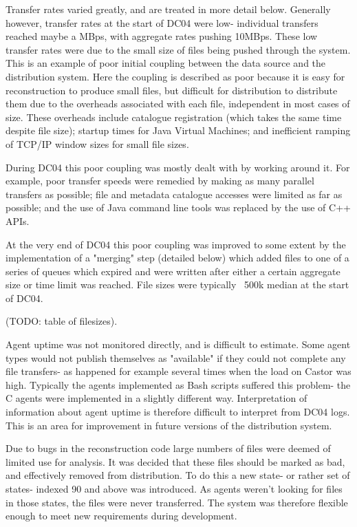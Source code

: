 \documentclass{cmspaper}
\begin{document}
Transfer rates varied greatly, and are treated in more detail below. Generally however, transfer rates at the start of DC04 were low- individual transfers reached maybe a MBps, with aggregate rates pushing 10MBps. These low transfer rates were due to the small size of files being pushed through the system. This is an example of poor initial coupling between the data source and the distribution system. Here the coupling is described as poor because it is easy for reconstruction to produce small files, but difficult for distribution to distribute them due to the overheads associated with each file, independent in most cases of size. These overheads include catalogue registration (which takes the same time despite file size); startup times for Java Virtual Machines; and inefficient ramping of TCP/IP window sizes for small file sizes.

During DC04 this poor coupling was mostly dealt with by working around it. For example, poor transfer speeds were remedied by making as many parallel transfers as possible; file and metadata catalogue accesses were limited as far as possible; and the use of Java command line tools was replaced by the use of C++ APIs.

At the very end of DC04 this poor coupling was improved to some extent by the implementation of a "merging" step (detailed below) which added files to one of a series of queues which expired and were written after either a certain aggregate size or time limit was reached. File sizes were typically ~500k median at the start of DC04.

(TODO: table of filesizes).

Agent uptime was not monitored directly, and is difficult to estimate. Some agent types would not publish themselves as "available" if they could not complete any file transfers- as happened for example several times when the load on Castor was high. Typically the agents implemented as Bash scripts suffered this problem- the C agents were implemented in a slightly different way.  Interpretation of information about agent uptime is therefore difficult to interpret from DC04 logs. This is an area for improvement in future versions of the distribution system.

Due to bugs in the reconstruction code large numbers of files were deemed of limited use for analysis. It was decided that these files should be marked as bad, and effectively removed from distribution. To do this a new state- or rather set of states- indexed 90 and above was introduced. As agents weren't looking for files in those states, the files were never transferred. The system was therefore flexible enough to meet new requirements during development.
\end{document}
